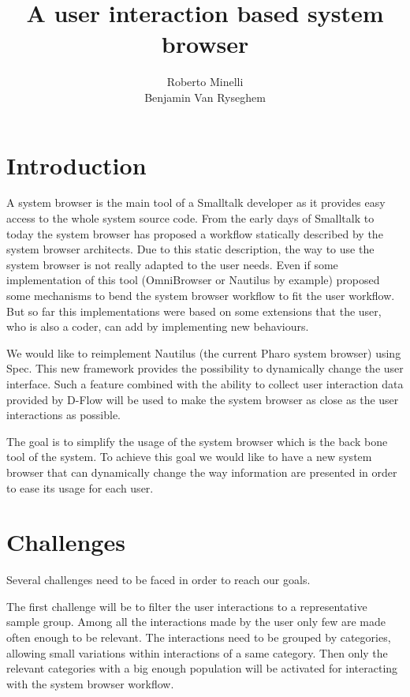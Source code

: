 \documentclass[12pt]{article}
\begin{document}
\title{A user interaction based system browser}
\author{Roberto Minelli\\Benjamin Van Ryseghem}
\maketitle

\section{Introduction}

A system browser is the main tool of a Smalltalk developer as it provides easy access to the whole system source code.
From the early days of Smalltalk to today the system browser has proposed a workflow statically described by the system browser architects.
Due to this static description, the way to use the system browser is not really adapted to the user needs. 
Even if some implementation of this tool (OmniBrowser or Nautilus by example) proposed some mechanisms to bend the system browser workflow to fit the user workflow.
But so far this implementations were based on some extensions that the user, who is also a coder, can add by implementing new behaviours.

We would like to reimplement Nautilus (the current Pharo system browser) using Spec.
This new framework provides the possibility to dynamically change the user interface.
Such a feature combined with the ability to collect user interaction data provided by D-Flow will be used to make the system browser 
as close as the user interactions as possible.

The goal is to simplify the usage of the system browser which is the back bone tool of the system. 
To achieve this goal we would like to have a new system browser that can dynamically change the way information are presented in order to ease its usage for each user.

\section{Challenges}

Several challenges need to be faced in order to reach our goals.

The first challenge will be to filter the user interactions to a representative sample group. 
Among all the interactions made by the user only few are made often enough to be relevant.
The interactions need to be grouped by categories, allowing small variations within interactions of a same category.
Then only the relevant categories with a big enough population will be activated for interacting with the system browser workflow.
\end{document}

